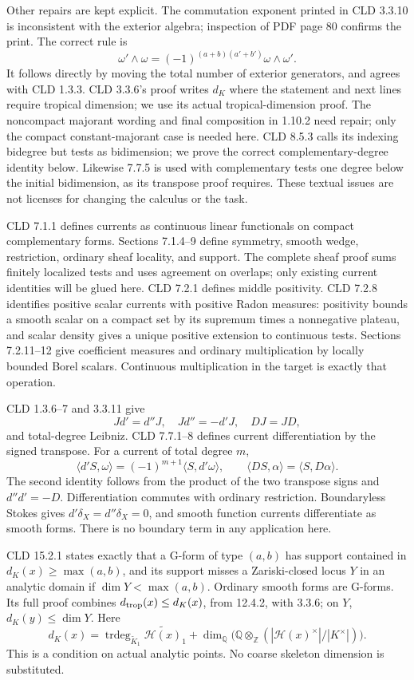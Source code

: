 \documentclass[11pt]{article}
\begin{document}
Other repairs are kept explicit. The commutation exponent printed in CLD 3.3.10 is inconsistent with the exterior algebra; inspection of PDF page 80 confirms the print. The correct rule is
\[
 \omega'\wedge\omega=(-1)^{(a+b)(a'+b')}\omega\wedge\omega'.
\]
It follows directly by moving the total number of exterior generators, and agrees with CLD 1.3.3. CLD 3.3.6's proof writes \(d_K\) where the statement and next lines require tropical dimension; we use its actual tropical-dimension proof. The noncompact majorant wording and final composition in 1.10.2 need repair; only the compact constant-majorant case is needed here. CLD 8.5.3 calls its indexing bidegree but tests as bidimension; we prove the correct complementary-degree identity below. Likewise 7.7.5 is used with complementary tests one degree below the initial bidimension, as its transpose proof requires. These textual issues are not licenses for changing the calculus or the task.

CLD 7.1.1 defines currents as continuous linear functionals on compact complementary forms. Sections 7.1.4--9 define symmetry, smooth wedge, restriction, ordinary sheaf locality, and support. The complete sheaf proof sums finitely localized tests and uses agreement on overlaps; only existing current identities will be glued here. CLD 7.2.1 defines middle positivity. CLD 7.2.8 identifies positive scalar currents with positive Radon measures: positivity bounds a smooth scalar on a compact set by its supremum times a nonnegative plateau, and scalar density gives a unique positive extension to continuous tests. Sections 7.2.11--12 give coefficient measures and ordinary multiplication by locally bounded Borel scalars. Continuous multiplication in the target is exactly that operation.

CLD 1.3.6--7 and 3.3.11 give
\[
 Jd'=d''J,\quad Jd''=-d'J,\quad DJ=JD,
\]
and total-degree Leibniz. CLD 7.7.1--8 defines current differentiation by the signed transpose. For a current of total degree \(m\),
\[
 \langle d'S,\omega\rangle=(-1)^{m+1}\langle S,d'\omega\rangle,
 \qquad
 \langle DS,\alpha\rangle=\langle S,D\alpha\rangle.
\]
The second identity follows from the product of the two transpose signs and \(d''d'=-D\). Differentiation commutes with ordinary restriction. Boundaryless Stokes gives \(d'\delta_X=d''\delta_X=0\), and smooth function currents differentiate as smooth forms. There is no boundary term in any application here.

CLD 15.2.1 states exactly that a G-form of type \((a,b)\) has support contained in \(d_K(x)\geq\max(a,b)\), and its support misses a Zariski-closed locus \(Y\) in an analytic domain if \(\dim Y<\max(a,b)\). Ordinary smooth forms are G-forms. Its full proof combines \(d_{\rm trop}(x)\leq d_K(x)\), from 12.4.2, with 3.3.6; on \(Y\), \(d_K(y)\leq\dim Y\). Here
\[
 d_K(x)=\operatorname{trdeg}_{\widetilde K_1}\widetilde{\mathscr H(x)}_1
 +\dim_{\mathbb Q}\bigl(\mathbb Q\otimes_{\mathbb Z}
 (|\mathscr H(x)^\times|/|K^\times|)\bigr).
\]
This is a condition on actual analytic points. No coarse skeleton dimension is substituted.
\end{document}
